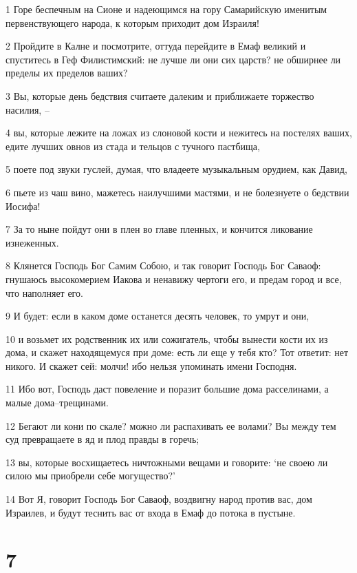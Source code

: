 \par 1 Горе беспечным на Сионе и надеющимся на гору Самарийскую именитым первенствующего народа, к которым приходит дом Израиля!
\par 2 Пройдите в Калне и посмотрите, оттуда перейдите в Емаф великий и спуститесь в Геф Филистимский: не лучше ли они сих царств? не обширнее ли пределы их пределов ваших?
\par 3 Вы, которые день бедствия считаете далеким и приближаете торжество насилия, --
\par 4 вы, которые лежите на ложах из слоновой кости и нежитесь на постелях ваших, едите лучших овнов из стада и тельцов с тучного пастбища,
\par 5 поете под звуки гуслей, думая, что владеете музыкальным орудием, как Давид,
\par 6 пьете из чаш вино, мажетесь наилучшими мастями, и не болезнуете о бедствии Иосифа!
\par 7 За то ныне пойдут они в плен во главе пленных, и кончится ликование изнеженных.
\par 8 Клянется Господь Бог Самим Собою, и так говорит Господь Бог Саваоф: гнушаюсь высокомерием Иакова и ненавижу чертоги его, и предам город и все, что наполняет его.
\par 9 И будет: если в каком доме останется десять человек, то умрут и они,
\par 10 и возьмет их родственник их или сожигатель, чтобы вынести кости их из дома, и скажет находящемуся при доме: есть ли еще у тебя кто? Тот ответит: нет никого. И скажет сей: молчи! ибо нельзя упоминать имени Господня.
\par 11 Ибо вот, Господь даст повеление и поразит большие дома расселинами, а малые дома--трещинами.
\par 12 Бегают ли кони по скале? можно ли распахивать ее волами? Вы между тем суд превращаете в яд и плод правды в горечь;
\par 13 вы, которые восхищаетесь ничтожными вещами и говорите: `не своею ли силою мы приобрели себе могущество?'
\par 14 Вот Я, говорит Господь Бог Саваоф, воздвигну народ против вас, дом Израилев, и будут теснить вас от входа в Емаф до потока в пустыне.

\chapter{7}

